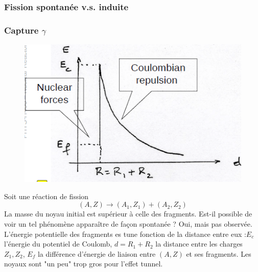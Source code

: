 \subsubsection{Fission spontanée v.s. induite}
\subsubsection{Capture $\gamma$}
	\begin{figure}
	\includegraphics[scale=0.475]{ch1/image10.png}
	\end{figure}
Soit une réaction de fission
\begin{equation}
(A,Z) \to (A_1,Z_1)+(A_2,Z_2)
\end{equation}
La masse du noyau initial est supérieur à celle des fragments. Est-il possible de voir un tel 
phénomène apparaître de façon spontanée ? Oui, mais pas observée. L'énergie potentielle des 
fragments es tune fonction de la distance entre eux :$E_c$ l'énergie du potentiel de Coulomb, $d
=R_1+R_2$ la distance entre les charges $Z_1,Z_2$, $E_f$ la différence d'énergie de liaison entre 
$(A,Z)$ et ses fragments. Les noyaux sont "un peu" trop gros pour l'effet tunnel. \\

